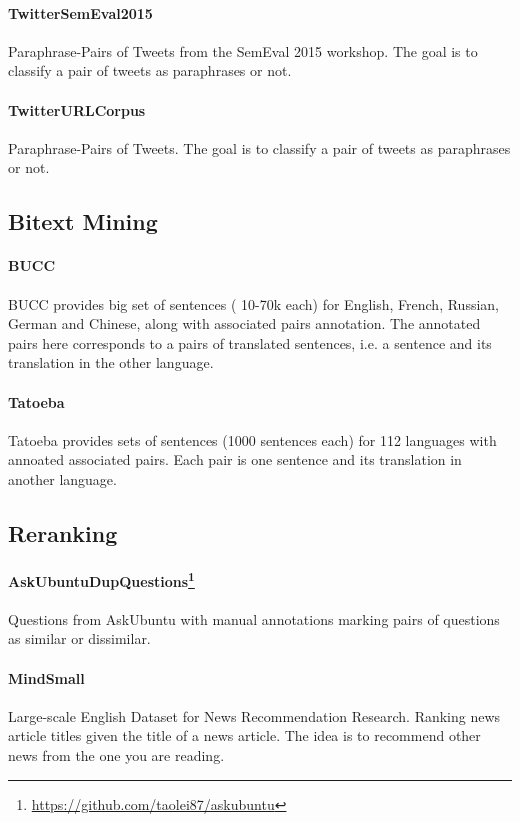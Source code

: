 \documentclass[11pt]{article}
\begin{document}
\paragraph{TwitterSemEval2015} \cite{xu2015semeval} Paraphrase-Pairs of Tweets from the SemEval 2015 workshop. The goal is to classify a pair of tweets as paraphrases or not.

\paragraph{TwitterURLCorpus} \cite{lan2017sentential} Paraphrase-Pairs of Tweets. The goal is to classify a pair of tweets as paraphrases or not.

\subsection{Bitext Mining}

\paragraph{BUCC} \cite{zweigenbaum2016bucc1, zweigenbaum2017bucc2, zweigenbaum2018bucc3} BUCC provides big set of sentences ( 10-70k each) for English, French, Russian, German and Chinese, along with associated pairs annotation. The annotated pairs here corresponds to a pairs of translated sentences, i.e. a sentence and its translation in the other language.

\paragraph{Tatoeba} \cite{tatoeba} Tatoeba provides sets of sentences (1000 sentences each) for 112 languages with annoated associated pairs. Each pair is one sentence and its translation in another language.

\subsection{Reranking}

\paragraph{AskUbuntuDupQuestions\footnote{\url{https://github.com/taolei87/askubuntu}}} Questions from AskUbuntu with manual annotations marking pairs of questions as similar or dissimilar.

\paragraph{MindSmall}\cite{wu2020mind} Large-scale English Dataset for News Recommendation Research. Ranking news article titles given the title of a news article. The idea is to recommend other news from the one you are reading.
\end{document}
